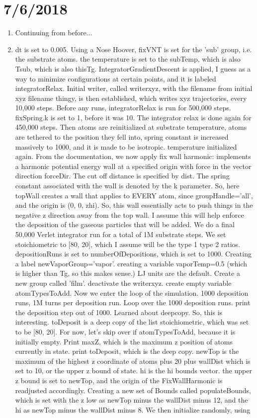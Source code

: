 \documentclass[12pt,reqno]{amsart}
\numberwithin{equation}{section}
\begin{document}
\section{7/6/2018}
\begin{enumerate}
\item Continuing from before...
\item dt is set to 0.005.  Using a Nose Hoover, fixVNT is set for the 'sub' group, i.e. the substrate atoms.  the temperature is set to the subTemp, which is also Tsub, which is also thisTg.  IntegratorGradientDescent is applied, I guess as a way to minimize configurations at certain points, and it is labeled integratorRelax.  Initial writer, called writerxyz, with the filename from initial xyz filename thingy, is then established, which writes xyz trajectories, every 10,000 steps.  Before any runs, integratorRelax is run for 500,000 steps.  fixSpring.k is set to 1, before it was 10.  The integrator relax is done again for 450,000 steps.  Then atoms are reinitialized at substrate temperature, atoms are tethered to the position they fell into, spring constant is increased massively to 1000, and it is made to be isotropic.  temperature initialized again.  From the documentation, we now apply fix wall harmonic: implements a harmonic potential energy wall at a specified origin with force in the vector direction forceDir.  The cut off distance is specified by dist.  The spring constant associated with the wall is denoted by the k parameter.  So, here topWall creates a wall that applies to EVERY atom, since groupHandle='all', and the origin is (0, 0, zhi).  So, this wall essentially acts to push things in the negative z direction away from the top wall.  I assume this will help enforce the deposition of the gaseous particles that will be added.  We do a final 50,000 Verlet integrator run for a total of 1M substrate steps.  We set stoichiometric to [80, 20], which I assume will be the type 1 type 2 ratios.  depositionRuns is set to numberOfDepositions, which is set to 1000.  Creating a label newVaporGroup='vapor'.  creating a variable vaporTemp=0.5 (which is higher than Tg, so this makes sense.)  LJ units are the default.  Create a new group called 'film'.  deactivate the writerxyz.  create empty variable atomTypesToAdd.  Now we enter the loop of the simulation.  1000 deposition runs, 1M turns per deposition run.  Loop over the 1000 deposition runs.  print the deposition step out of 1000.  Learned about deepcopy.  So, this is interesting.  toDeposit is a deep copy of the list stoichiometric, which was set to be [80, 20].  For now, let's skip over if atomTypesToAdd, because it is initially empty.  Print maxZ, which is the maximum z position of atoms currently in state.  print toDeposit, which is the deep copy.  newTop is the maximum of the highest z coordinate of atoms plus 20 plus wallDist which is set to 10, or the upper z bound of state.  hi is the hi bounds vector.  the upper z bound is set to newTop, and the origin of the FixWallHarmonic is readjusted accordingly.  Creating a new set of Bounds called populateBounds, which is set with the z low as newTop minus the wallDist minus 12, and the hi as newTop minus the wallDist minus 8.  We then initialize randomly, using 
\end{enumerate}
\end{document}
